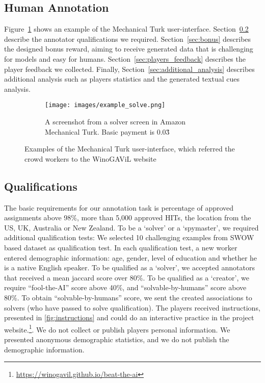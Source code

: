 \documentclass{article}
\newcommand{\ouracronym}[0]{WinoGAViL}
\begin{document}
 
\subsection{Human Annotation}
Figure~\ref{fig:mturk_ui_examples} shows an example of the Mechanical Turk user-interface. Section~\ref{sec:quals} describe the annotator qualifications we required. Section~\ref{sec:bonus} describes the designed bonus reward, aiming to receive generated data that is challenging for models and easy for humans. Section~\ref{sec:players_feedback} describes the player feedback we collected. Finally, Section~\ref{sec:additional_analysis} describes additional analysis such as players statistics and the generated textual cues analysis. 

\begin{figure}[!htb]
\centering
\begin{subfigure}[b]{0.9\textwidth}
   \texttt{[image: images/example\_solve.png]}
   \caption{A screenshot from a solver screen in Amazon Mechanical Turk. Basic payment is 0.03\.}
\end{subfigure}

\caption{Examples of the Mechanical Turk user-interface, which referred the crowd workers to the \ouracronym{} website}
\label{fig:mturk_ui_examples}
\end{figure}
 
\subsection{Qualifications} 
\label{sec:quals}
The basic requirements for our annotation task is percentage of approved assignments above 98\%, more than 5,000 approved HITs, the location from the US, UK, Australia or New Zealand. To be a `solver' or a `spymaster', we required additional qualification tests: We selected 10 challenging examples from SWOW based dataset as qualification test. In each qualification test, a new worker entered demographic information: age, gender, level of education and whether he is a native English speaker. To be qualified as a `solver', we accepted annotators that received a mean jaccard score over 80\%. To be qualified as a `creator', we require ``fool-the-AI'' score above 40\%, and ``solvable-by-humans'' score above 80\%. To obtain ``solvable-by-humans'' score, we sent the created associations to solvers (who have passed to solve qualification). The players received instructions, presented in \ref{fig:instructions} and could do an interactive practice in the project website.\footnote{\url{https://winogavil.github.io/beat-the-ai}}. We do not collect or publish players personal information. We presented anonymous demographic statistics, and we do not publish the demographic information.
\end{document}
